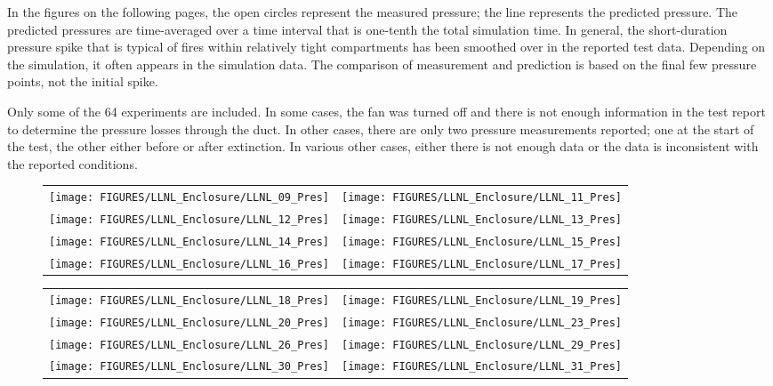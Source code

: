 In the figures on the following pages, the open circles represent the measured pressure; the line represents the predicted pressure. The
predicted pressures are time-averaged over a time interval that is one-tenth the total simulation time. In general, the short-duration pressure
spike that is typical of fires within relatively tight compartments has been smoothed over in the reported test data. Depending on the simulation, it
often appears in the simulation data. The comparison of measurement and prediction is based on the final few pressure points, not the
initial spike.

Only some of the 64 experiments are included. In some cases, the fan was turned off and there is not enough information in the test report to determine the pressure losses through the duct. In other cases, there are only two pressure measurements reported; one at the start of the test, the other either before or after extinction. In various other cases, either there is not enough data or the data is inconsistent with the reported conditions.

\begin{figure}[p]
\begin{tabular*}{\textwidth}{l@{\extracolsep{\fill}}r}
\texttt{[image: FIGURES/LLNL\_Enclosure/LLNL\_09\_Pres]} &
\texttt{[image: FIGURES/LLNL\_Enclosure/LLNL\_11\_Pres]} \\
\texttt{[image: FIGURES/LLNL\_Enclosure/LLNL\_12\_Pres]} &
\texttt{[image: FIGURES/LLNL\_Enclosure/LLNL\_13\_Pres]} \\
\texttt{[image: FIGURES/LLNL\_Enclosure/LLNL\_14\_Pres]} &
\texttt{[image: FIGURES/LLNL\_Enclosure/LLNL\_15\_Pres]} \\
\texttt{[image: FIGURES/LLNL\_Enclosure/LLNL\_16\_Pres]} &
\texttt{[image: FIGURES/LLNL\_Enclosure/LLNL\_17\_Pres]}
\end{tabular*}
\label{LLNL_Enclosure_Pres_2}
\end{figure}

\begin{figure}[p]
\begin{tabular*}{\textwidth}{l@{\extracolsep{\fill}}r}
\texttt{[image: FIGURES/LLNL\_Enclosure/LLNL\_18\_Pres]} &
\texttt{[image: FIGURES/LLNL\_Enclosure/LLNL\_19\_Pres]} \\
\texttt{[image: FIGURES/LLNL\_Enclosure/LLNL\_20\_Pres]} &
\texttt{[image: FIGURES/LLNL\_Enclosure/LLNL\_23\_Pres]} \\
\texttt{[image: FIGURES/LLNL\_Enclosure/LLNL\_26\_Pres]} &
\texttt{[image: FIGURES/LLNL\_Enclosure/LLNL\_29\_Pres]} \\
\texttt{[image: FIGURES/LLNL\_Enclosure/LLNL\_30\_Pres]} &
\texttt{[image: FIGURES/LLNL\_Enclosure/LLNL\_31\_Pres]}
\end{tabular*}
\label{LLNL_Enclosure_Pres_3}
\end{figure}

